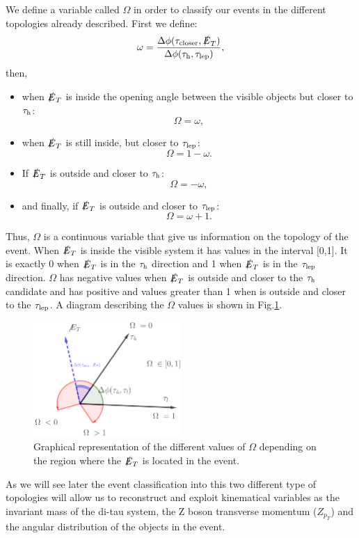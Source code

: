 We define a variable called $\Omega$ in order to classify our events in the different topologies already described. First we define:
\begin{equation}
	\omega=\frac{\Delta\phi(\tau_{\text{closer}},\slashed{E}_T)}{\Delta\phi(\tau_\text{h},\tau_\text{lep})},
\end{equation}
then,
\begin{itemize}
	\item when $\slashed{E}_T$ is inside the opening angle between the visible objects but closer to $\tau_\text{h}$:
	\begin{equation}
		\Omega=\omega,
	\end{equation}
	\item when $\slashed{E}_T$ is still inside, but closer to $\tau_\text{lep}$:
	\begin{equation}
		\Omega=1-\omega.
	\end{equation}
	\item If $\slashed{E}_T$ is outside and closer to $\tau_\text{h}$:
	\begin{equation}
		\Omega=-\omega,
	\end{equation}
	\item and finally, if $\slashed{E}_T$ is outside and closer to $\tau_\text{lep}$:
	\begin{equation}
		\Omega=\omega+1.
	\end{equation}
\end{itemize}
Thus, $\Omega$ is a continuous variable that give us information on the topology of the event. When $\slashed{E}_T$ is inside the visible system it has values in the interval [0,1]. It is exactly 0 when $\slashed{E}_T$ is in the $\tau_\text{h}$ direction and 1 when $\slashed{E}_T$ is in the $\tau_\text{lep}$ direction. $\Omega$ has negative values when $\slashed{E}_T$ is outside and closer to the $\tau_\text{h}$ candidate and has positive and values greater than 1 when is outside and closer to the $\tau_\text{lep}$. A diagram describing the $\Omega$ values is shown in Fig.\ref{Fig8}.
\begin{figure}[h]
	\centering
	\includegraphics[width=0.5\textwidth]{figures/Fig8}
	\caption{Graphical representation of the different values of $\Omega$ depending on the region where the $\slashed{E}_T$ is located in the event.}
	\label{Fig8}
\end{figure}
As we will see later the event classification into this two different type of topologies will allow us to reconstruct and exploit kinematical variables as the invariant mass of the di-tau system, the Z boson transverse momentum ($Z_{p_T}$) and the angular distribution of the objects in the event.
